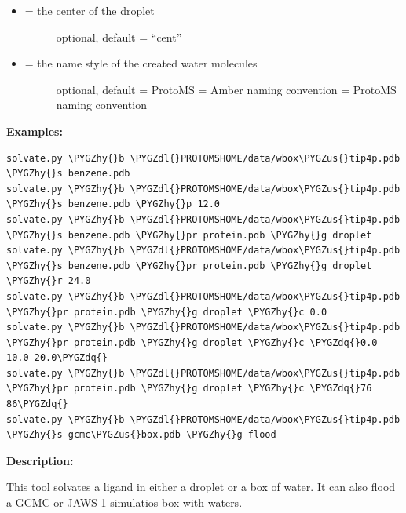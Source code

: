 \documentclass[letterpaper,10pt,english]{sphinxmanual}
\def\PYGZus{\char`\_}
\def\PYGZdl{\char`\$}
\def\PYGZhy{\char`\-}
\def\PYGZdq{\char`\"}
\begin{document}
\begin{itemize}
\begin{description}
\end{description}

\item {} \begin{description}
\item[{ = the center of the droplet}] \leavevmode
optional, default = ``cent''

\end{description}

\item {} \begin{description}
\item[{ = the name style of the created water molecules}] \leavevmode
optional, default = ProtoMS
 = Amber naming convention
 = ProtoMS naming convention

\end{description}

\end{itemize}

\textbf{Examples:}

\begin{Verbatim}[frame=single,commandchars=\\\{\}]
solvate.py \PYGZhy{}b \PYGZdl{}PROTOMSHOME/data/wbox\PYGZus{}tip4p.pdb \PYGZhy{}s benzene.pdb
solvate.py \PYGZhy{}b \PYGZdl{}PROTOMSHOME/data/wbox\PYGZus{}tip4p.pdb \PYGZhy{}s benzene.pdb \PYGZhy{}p 12.0
solvate.py \PYGZhy{}b \PYGZdl{}PROTOMSHOME/data/wbox\PYGZus{}tip4p.pdb \PYGZhy{}s benzene.pdb \PYGZhy{}pr protein.pdb \PYGZhy{}g droplet
solvate.py \PYGZhy{}b \PYGZdl{}PROTOMSHOME/data/wbox\PYGZus{}tip4p.pdb \PYGZhy{}s benzene.pdb \PYGZhy{}pr protein.pdb \PYGZhy{}g droplet \PYGZhy{}r 24.0
solvate.py \PYGZhy{}b \PYGZdl{}PROTOMSHOME/data/wbox\PYGZus{}tip4p.pdb \PYGZhy{}pr protein.pdb \PYGZhy{}g droplet \PYGZhy{}c 0.0
solvate.py \PYGZhy{}b \PYGZdl{}PROTOMSHOME/data/wbox\PYGZus{}tip4p.pdb \PYGZhy{}pr protein.pdb \PYGZhy{}g droplet \PYGZhy{}c \PYGZdq{}0.0 10.0 20.0\PYGZdq{}
solvate.py \PYGZhy{}b \PYGZdl{}PROTOMSHOME/data/wbox\PYGZus{}tip4p.pdb \PYGZhy{}pr protein.pdb \PYGZhy{}g droplet \PYGZhy{}c \PYGZdq{}76 86\PYGZdq{}
solvate.py \PYGZhy{}b \PYGZdl{}PROTOMSHOME/data/wbox\PYGZus{}tip4p.pdb \PYGZhy{}s gcmc\PYGZus{}box.pdb \PYGZhy{}g flood
\end{Verbatim}

\textbf{Description:}

This tool solvates a ligand in either a droplet or a box of water. It can also flood a GCMC or JAWS-1 simulatios box with waters.
\end{document}
